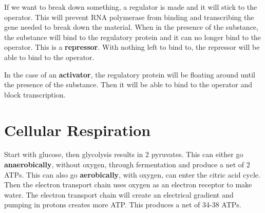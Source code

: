 \documentclass{article}
\begin{document}
If we want to break down something, a regulator is made and it will stick to the
operator. This will prevent RNA polymerase from binding and transcribing the
gene needed to break down the material. When in the presence of the substance,
the substance will bind to the regulatory protein and it can no longer bind to
the operator. This is a \textbf{repressor}. With nothing left to bind to, the
repressor will be able to bind to the operator.

In the case of an \textbf{activator}, the regulatory protein will be floating
around until the presence of the substance. Then it will be able to bind to the
operator and block transcription.

\section{Cellular Respiration}

Start with glucose, then glycolysis results in 2 pyruvates. This can either go
\textbf{anaerobically}, without oxygen, through fermentation and produce a net
of 2 ATPs. This can also go \textbf{aerobically}, with oxygen, can enter the
citric acid cycle. Then the electron transport chain uses oxygen as an electron
receptor to make water. The electron transport chain will create an electrical
gradient and pumping in protons creates more ATP. This produces a net of 34-38
ATPs.
\end{document}
